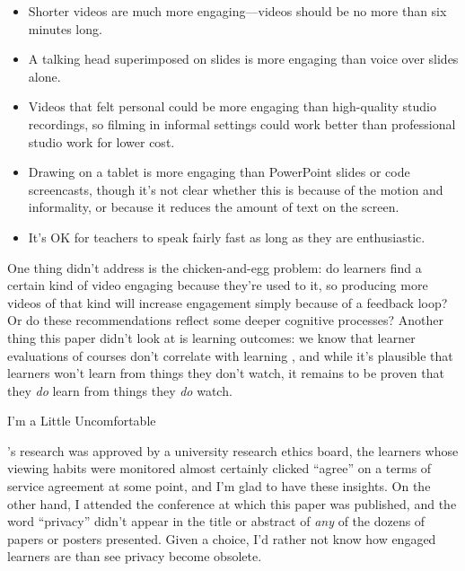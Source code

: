 \begin{itemize}

\item
  Shorter videos are much more engaging---videos should be no more
  than six minutes long.

\item
  A talking head superimposed on slides is more engaging than voice
  over slides alone.
  
\item
  Videos that felt personal could be more engaging than high-quality
  studio recordings, so filming in informal settings could work better
  than professional studio work for lower cost.

\item
  Drawing on a tablet is more engaging than PowerPoint slides or code
  screencasts, though it's not clear whether this is because of the
  motion and informality, or because it reduces the amount of text on
  the screen.

\item
  It's OK for teachers to speak fairly fast as long as they are
  enthusiastic.

\end{itemize}

One thing \cite{Guo2014} didn't address is the chicken-and-egg
problem: do learners find a certain kind of video engaging because
they're used to it, so producing more videos of that kind will
increase engagement simply because of a feedback loop? Or do these
recommendations reflect some deeper cognitive processes? Another thing
this paper didn't look at is learning outcomes: we know that learner
evaluations of courses don't correlate with learning
\cite{Star2014,Uttl2017}, and while it's plausible that learners won't
learn from things they don't watch, it remains to be proven that they
\emph{do} learn from things they \emph{do} watch.

\begin{callout}{I'm a Little Uncomfortable}

  \cite{Guo2014}'s research was approved by a university research
  ethics board, the learners whose viewing habits were monitored
  almost certainly clicked ``agree'' on a terms of service agreement
  at some point, and I'm glad to have these insights.  On the other
  hand, I attended the conference at which this paper was published,
  and the word ``privacy'' didn't appear in the title or abstract of
  \emph{any} of the dozens of papers or posters presented.  Given a
  choice, I'd rather not know how engaged learners are than see
  privacy become obsolete.

\end{callout}

